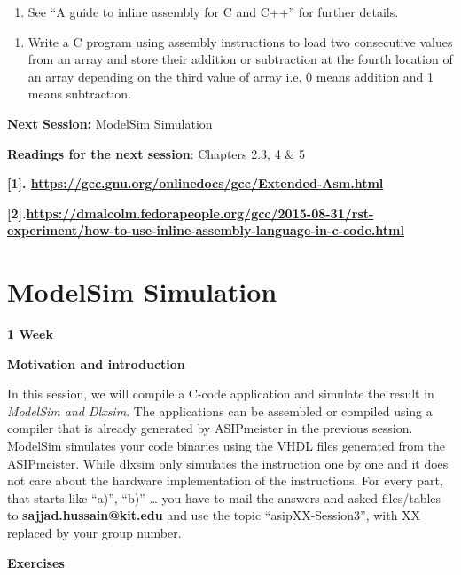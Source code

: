 \documentclass[
]{article}
\begin{document}
\begin{enumerate}
\def\labelenumi{\arabic{enumi}.}
\setcounter{enumi}{4}
\item
  See ``A guide to inline assembly for C and C++'' for further details.
\end{enumerate}

\begin{enumerate}
\def\labelenumi{\alph{enumi})}
\item
  Write a C program using assembly instructions to load two consecutive
  values from an array and store their addition or subtraction at the
  fourth location of an array depending on the third value of array i.e.
  0 means addition and 1 means subtraction.
\end{enumerate}

\textbf{Next Session:} ModelSim Simulation

\textbf{Readings for the next session}: Chapters 2.3, 4 \& 5

\textbf{{[}1{]}.
\url{https://gcc.gnu.org/onlinedocs/gcc/Extended-Asm.html}}

\textbf{{[}2{]}.\url{https://dmalcolm.fedorapeople.org/gcc/2015-08-31/rst-experiment/how-to-use-inline-assembly-language-in-c-code.html}}

\hypertarget{modelsim-simulation}{%
\section{\texorpdfstring{ModelSim \textbf{Simulation}
}{ModelSim Simulation }}\label{modelsim-simulation}}

\textbf{{1 Week}}

\textbf{Motivation and introduction}

In this session, we will compile a C-code application and simulate the
result in \emph{ModelSim and Dlxsim}. The applications can be assembled
or compiled using a compiler that is already generated by ASIPmeister in
the previous session. ModelSim simulates your code binaries using the
VHDL files generated from the ASIPmeister. While dlxsim only simulates
the instruction one by one and it does not care about the hardware
implementation of the instructions. For every part, that starts like
``a)'', ``b)'' \ldots{} you have to mail the answers and asked
files/tables to \textbf{sajjad.hussain@kit.edu} and use the topic
``asipXX-Session3'', with XX replaced by your group number.

\textbf{Exercises}
\end{document}
